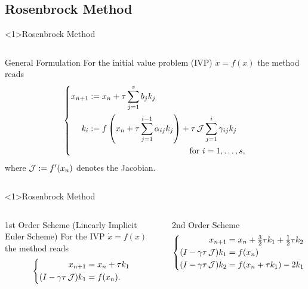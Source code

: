 \subsection{Rosenbrock Method}

\begin{frame}<1>{Rosenbrock Method}
\begin{columns}
  \begin{block}{General Formulation}
    For the initial value problem (IVP) $\dot x = f(x)$ the method reads
    \begin{equation*}
    \left\{
    \begin{aligned}
      x_{n+1} &:= x_n + \tau \sum_{j=1}^s b_j k_j
      \\
      k_i &:= \begin{multlined}[t]
      f\left( x_n + \tau \sum_{j=1}^{i-1} \alpha_{ij} k_j \right) + \tau \Jac \sum_{j=1}^i \gamma_{ij} k_j
      \\
      \text{for } i = 1, \ldots, s
      ,
      \end{multlined}
    \end{aligned}
    \right.
    \end{equation*}
    where $\operatorname{\mathcal J} := f'(x_n)$ denotes the Jacobian.
  \end{block}
\end{columns}
\end{frame}

\begin{frame}<1>{Rosenbrock Method}
\begin{columns}
  \begin{block}{1st Order Scheme (Linearly Implicit Euler Scheme)}
    For the IVP $\dot x = f(x)$ the method reads
    \begin{equation*}
    \left\{
    \begin{aligned}
      x_{n+1} &= x_n + \tau k_1 \\
      (I - \gamma\tau \operatorname{\mathcal J}) k_1 &= f(x_n)
      .
    \end{aligned}
    \right.
    \end{equation*}
  \end{block}
  \begin{block}{2nd Order Scheme \parencite{Verwer1999}}
    \begin{equation*}
    \left\{
    \begin{aligned}
      x_{n+1} &= x_n + \tfrac{3}{2} \tau k_1 + \tfrac{1}{2} \tau k_2 \\
      (I - \gamma\tau \operatorname{\mathcal J}) k_1 &= f(x_n) \\
      (I - \gamma\tau \operatorname{\mathcal J}) k_2 &= f(x_n + \tau k_1) - 2k_1
    \end{aligned}
    \right.
    \end{equation*}
  \end{block}
\end{columns}
\end{frame}

